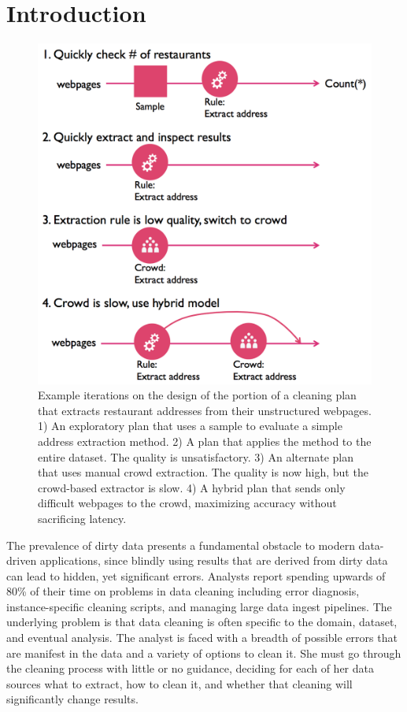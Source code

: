 \section{Introduction}\label{sec:intro}

\begin{figure}[t]
\centering
\vspace{-0.5cm}
\includegraphics[width = .4\textwidth]{figs/lifecycle.png}
\vspace{-0.4cm}
\caption{Example iterations on the design of the portion of a cleaning plan that extracts restaurant addresses from their unstructured webpages.  
1) An exploratory plan that uses a sample to evaluate a simple address extraction method.
2) A plan that applies the method to the entire dataset. The quality is unsatisfactory. 
3) An alternate plan that uses manual crowd extraction. The quality is now high, but the crowd-based extractor is slow. 
4) A hybrid plan that sends only difficult webpages to the crowd, maximizing accuracy without sacrificing latency.}
\label{fig:ex-plan}
\vspace{-0.6cm}
\end{figure}

%
%
The prevalence of dirty data presents a fundamental obstacle to modern data-driven applications, since 
blindly using results that are derived from dirty data can lead to hidden, yet significant errors.
Analysts report spending upwards of 80\% of their time on problems in data cleaning \cite{kandel2012} including 
error diagnosis, instance-specific cleaning scripts, and managing large data ingest pipelines.
The underlying problem is that data cleaning is often specific to the domain, dataset, and eventual analysis.
The analyst is faced with a breadth of possible errors that are manifest in the data and a variety of options to clean it.
She must go through the cleaning process with little or no guidance, deciding for each of her data sources what to extract, how to clean it, and whether that cleaning will significantly change results.

